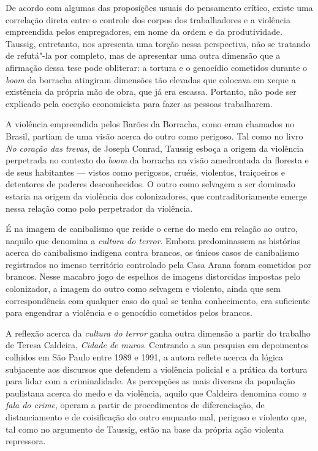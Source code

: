 De acordo com algumas das proposições usuais do pensamento crítico,
existe uma correlação direta entre o controle dos corpos dos
trabalhadores e a violência empreendida pelos empregadores, em nome da
ordem e da produtividade. Taussig, entretanto, nos apresenta uma torção
nessa perspectiva, não se tratando de refutá"-la por completo, mas de
apresentar uma outra dimensão que a afirmação dessa tese pode obliterar:
a tortura e o genocídio cometidos durante o \emph{boom} da borracha
atingiram dimensões tão elevadas que colocava em xeque a existência da
própria mão de obra, que já era escassa. Portanto, não pode ser
explicado pela coerção economicista para fazer as pessoas trabalharem.

A violência empreendida pelos Barões da Borracha, como eram chamados no
Brasil, partiam de uma visão acerca do outro como perigoso. Tal como no
livro \emph{No coração das trevas}, de Joseph Conrad, Taussig esboça a
origem da violência perpetrada no contexto do \emph{boom} da borracha na
visão amedrontada da floresta e de seus habitantes --- vistos como
perigosos, cruéis, violentos, traiçoeiros e detentores de poderes
desconhecidos. O outro como selvagem a ser dominado estaria na origem da
violência dos colonizadores, que contraditoriamente emerge nessa relação
como polo perpetrador da violência.

É na imagem de canibalismo que reside o cerne do medo em relação ao
outro, naquilo que denomina a \emph{cultura do terror}. Embora
predominassem as histórias acerca do canibalismo indígena contra
brancos, os únicos casos de canibalismo registrados no imenso território
controlado pela Casa Arana foram cometidos por brancos. Nesse macabro
jogo de espelhos de imagens distorcidas impostas pelo colonizador, a
imagem do outro como selvagem e violento, ainda que sem correspondência
com qualquer caso do qual se tenha conhecimento, era suficiente para
engendrar a violência e o genocídio cometidos pelos brancos.

A reflexão acerca da \emph{cultura do terror} ganha outra dimensão a
partir do trabalho de Teresa Caldeira, \emph{Cidade de muros}. Centrando
a sua pesquisa em depoimentos colhidos em São Paulo entre 1989 e 1991, a
autora reflete acerca da lógica subjacente aos discursos que defendem a
violência policial e a prática da tortura para lidar com a
criminalidade. As percepções as mais diversas da população paulistana
acerca do medo e da violência, aquilo que Caldeira denomina como \emph{a
fala do crime}, operam a partir de procedimentos de diferenciação, de
distanciamento e de coisificação do outro enquanto mal, perigoso e
violento que, tal como no argumento de Taussig, estão na base da própria
ação violenta repressora.


